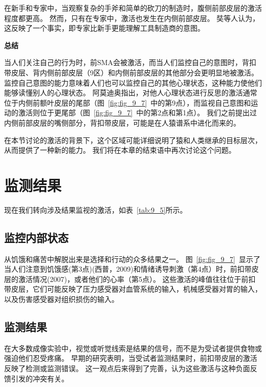 在新手和专家中，当观察复杂的手斧和简单的砍刀的制造时，腹侧前部皮层的激活程度都更高。
然而，只有在专家中，激活也发生在内侧前部皮层。
奘等人认为，这反映了一个事实，即专家比新手更能理解工具制造商的意图。
\par


\textbf{总结}
\par

当人们关注自己的行为时，前SMA会被激活，而当人们监控自己的意图时，背扣带皮层、背内侧前部皮层（9区）和内侧前部皮层的其他部分会更明显地被激活。
监控自己意图的能力意味着人们也可以监控自己的其他心理状态，这种能力使他们能够读懂别人的心理状态。
阿莫迪奥\cite{amodio2006meeting}指出，对他人心理状态进行反思的激活通常位于内侧前额叶皮层的尾部（图~\ref{fig:fig_9_7}~中的第9点），而监视自己意图和运动的激活则位于更尾部（图~\ref{fig:fig_9_7}~中的第2点和第1点）。
我们之前提出过内侧前部皮层的嘴侧部分，背扣带皮层，可能是在人猿谱系中进化而来的。
\par


在本节讨论的激活的背景下，这个区域可能详细说明了猿和人类继承的目标层次，从而提供了一种新的能力。
我们将在本章的结束语中再次讨论这个问题。



\section{监测结果}
\par
现在我们转向涉及结果监视的激活，如表~\ref{tab:9_5}所示。


\subsection{监控内部状态}
\par

从饥饿和痛苦中解脱出来是选择和行动的众多结果之一。
图~\ref{fig:fig_9_7}~显示了当人们注意到饥饿感(第3点)(西普，2009)和情绪诱导刺激（第4点）\cite{siep2009hunger}时，前扣带皮层的激活情况(2007)，或者他们的心率（第5点）\cite{critchley2004neural}。
这些激活的峰值往往位于前扣带皮层，它们可能反映了压力感受器对血管系统的输入，机械感受器对胃的输入，以及伤害感受器对组织损伤的输入\cite{ba2009architecture}。
\par



\subsection{监测结果}
\par
在大多数成像实验中，视觉或听觉线索是结果的信号，而不是为受试者提供食物或强迫他们忍受疼痛。
早期的研究表明，当受试者监测结果时，前扣带皮层的激活反映了检测或监测错误\cite{carter1998anterior}。
这一观点后来得到了完善，认为这些激活与这种负面反馈引发的冲突有关\cite{botvinick2001conflict}。
\par


